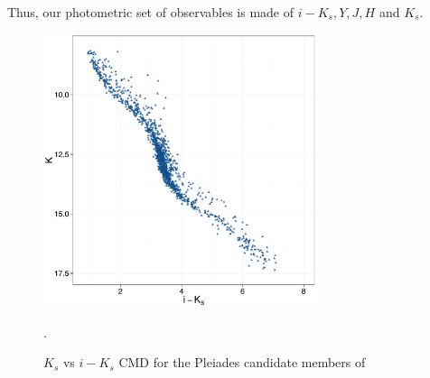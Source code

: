Thus, our photometric set of observables is made of $i-K_s, Y,J,H$ and $K_s$. 

\begin{figure}[ht!]
\begin{center}
\includegraphics[page=1,height=8cm]{background/Figures/CIs.pdf}
\caption{$K_s$ vs $i-K_s$ CMD for the Pleiades candidate members of \citet{Bouy2015}}.
\label{fig:CI}
\end{center}
\end{figure}

